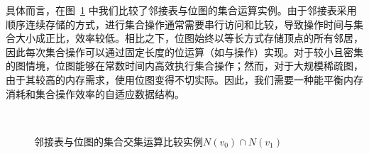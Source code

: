 具体而言，在图~\ref{fig:adambe_intersection} 中我们比较了邻接表与位图的集合运算实例。由于邻接表采用顺序连续存储的方式，进行集合操作通常需要串行访问和比较，导致操作时间与集合大小成正比，效率较低。相比之下，位图始终以等长方式存储顶点的所有邻居，因此每次集合操作可以通过固定长度的位运算（如与操作）实现。对于较小且密集的图情境，位图能够在常数时间内高效执行集合操作；然而，对于大规模稀疏图，由于其较高的内存需求，使用位图变得不切实际。因此，我们需要一种能平衡内存消耗和集合操作效率的自适应数据结构。






\begin{figure} [H]
	\centering
  \\
	\caption{邻接表与位图的集合交集运算比较实例$N(v_0)\cap N(v_1)$}
	
	\label{fig:adambe_intersection}
\end{figure}


